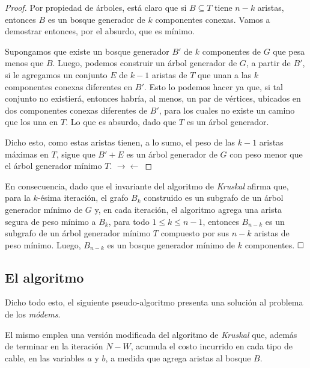 \begin{proof}
Por propiedad de árboles, está claro que si $B \subseteq T$ tiene $n - k$ aristas, entonces $B$ es un bosque generador de $k$ componentes conexas. Vamos a demostrar entonces, por el absurdo, que es mínimo.

Supongamos que existe un bosque generador $B'$ de $k$ componentes de $G$ que pesa menos que $B$. Luego, podemos construir un árbol generador de $G$, a partir de $B'$, si le agregamos un conjunto $E$ de $k-1$ aristas de $T$ que unan a las $k$ componentes conexas diferentes en $B'$. Esto lo podemos hacer ya que, si tal conjunto no existierá, entonces habría, al menos, un par de vértices, ubicados en dos componentes conexas diferentes de $B'$, para los cuales no existe un camino que los una en $T$. Lo que es absurdo, dado que $T$ es un árbol generador.

Dicho esto, como estas aristas tienen, a lo sumo, el peso de las $k-1$ aristas máximas en $T$, sigue que $B' + E$ es un árbol generador de $G$ con peso menor que el árbol generador mínimo $T$. $\rightarrow\leftarrow$  
\end{proof}
En consecuencia, dado que el invariante del algoritmo de \textit{Kruskal} afirma que, para la $k$-ésima iteración, el grafo $B_k$ construido es un subgrafo de un árbol generador mínimo de $G$ y, en cada iteración, el algoritmo agrega una arista segura de peso mínimo a $B_k$, para todo $1 \leq k \leq n-1$, entonces $B_{n-k}$ es un subgrafo de un árbol generador mínimo $T$ compuesto por sus $n-k$ aristas de peso mínimo. Luego, $B_{n-k}$ es un bosque generador mínimo de $k$ componentes. $\hfill \square$

\subsection{El algoritmo} Dicho todo esto, el siguiente pseudo-algoritmo presenta una solución al problema de los \textit{módems}. %



El mismo emplea una versión modificada del algoritmo de \textit{Kruskal} que, además de terminar en la iteración $N - W$, acumula el costo incurrido en cada tipo de cable, en las variables $a$ y $b$, a medida que agrega aristas al bosque $B$. %

